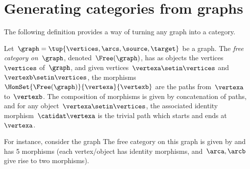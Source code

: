 
\section[Categories from graphs]{Generating categories from graphs}
\label{sec:catsfromgraphs}

The following definition provides a way of turning any graph into a category.

\begin{ctdefinition}
    \label{def:free-category}
    Let~$\graph=\tup{\vertices,\arcs,\source,\target}$ be a graph.
    The \emph{free category on~$\graph$}, denoted~$\Free(\graph)$, has as objects the vertices~$\vertices$ of~$\graph$, and given vertices~$\vertexa\setin \vertices$ and~$\vertexb\setin \vertices$, the morphisms~$\HomSet{\Free(\graph)}{\vertexa}{\vertexb}$ are the paths from~$\vertexa$ to~$\vertexb$.
    The composition of morphisms is given by concatenation of paths, and for any object~$\vertexa \setin \vertices$, the associated identity morphism~$\catidat\vertexa$ is the trivial path which starts and ends at~$\vertexa$.
\end{ctdefinition}

For instance, consider the graph
The free category on this graph is given by
and has 5 morphisms (each vertex/object has identity morphisms, and~$\arca,\arcb$ give rise to two morphisms).

